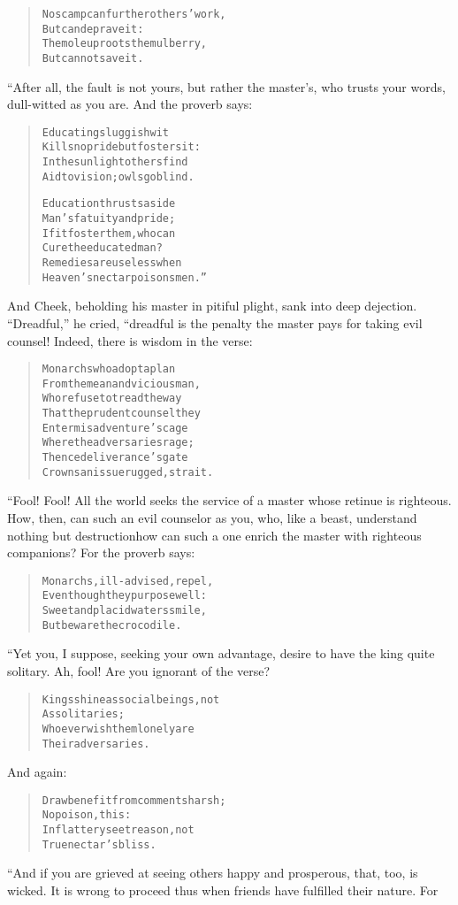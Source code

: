\documentclass[article, twoside, 14pt]{memoir}
\renewenvironment{verbatim}{%
\begin{quote}%
\vskip -10pt%
\begin{alltt}\normalfont\large}{\end{alltt}%
\end{quote}%
\vskip -10pt
} %
\begin{document}
\begin{verbatim}
No scamp can further others' work,
    But can deprave it:
The mole uproots the mulberry,
    But cannot save it.
\end{verbatim}
“After all, the fault is not yours, but rather the master's, who
trusts your words, dull-witted as you are. And the proverb says:

\begin{verbatim}
Educating sluggish wit
Kills no pride but fosters it:
In the sunlight others find
Aid to vision; owls go blind.

Education thrusts aside
Man's fatuity and pride;
If it foster them, who can
Cure the educated man?
Remedies are useless when
Heaven's nectar poisons men.”
\end{verbatim}
And Cheek, beholding his master in pitiful plight, sank into deep
dejection. ``Dreadful,'' he cried, “dreadful is the penalty the
master pays for taking evil counsel! Indeed, there is wisdom in the
verse:

\begin{verbatim}
Monarchs who adopt a plan
From the mean and vicious man,
Who refuse to tread the way
That the prudent counsel{\textemdash}they
Enter misadventure's cage
Where the adversaries rage;
Thence deliverance's gate
Crowns an issue rugged, strait.
\end{verbatim}
“Fool! Fool! All the world seeks the service of a master whose
retinue is righteous. How, then, can such an evil counselor as you,
who, like a beast, understand nothing but destruction{\textemdash}how can
such a one enrich the master with righteous companions? For the
proverb says:

\begin{verbatim}
Monarchs, ill-advised, repel,
Even though they purpose well:
Sweet and placid waters smile,
But beware the crocodile.
\end{verbatim}
“Yet you, I suppose, seeking your own advantage, desire to have the
king quite solitary. Ah, fool! Are you ignorant of the verse?

\begin{verbatim}
Kings shine as social beings, not
    As solitaries;
Whoever wish them lonely are
    Their adversaries.
\end{verbatim}
And again:

\begin{verbatim}
Draw benefit from comments harsh;
    No poison, this:
In flattery see treason, not
    True nectar's bliss.
\end{verbatim}
“And if you are grieved at seeing others happy and prosperous,
that, too, is wicked. It is wrong to proceed thus when friends have
fulfilled their nature. For
\end{document}
